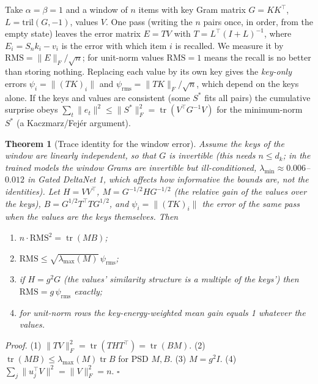 \documentclass{article}
\newtheorem{theorem}{Theorem}
\newcommand{\tr}{\operatorname{tr}}
\begin{document}
Take $\alpha=\beta=1$ and a window of $n$ items with key Gram matrix $G=KK^\top$, $L=\mathrm{tril}(G,-1)$, values $V$. One pass (writing the $n$ pairs once, in order, from the empty state) leaves the error matrix $E=TV$ with $T=L^\top(I+L)^{-1}$, where $E_i=S_nk_i-v_i$ is the error with which item $i$ is recalled. We measure it by $\mathrm{RMS}=\|E\|_F/\sqrt n$; for unit-norm values $\mathrm{RMS}=1$ means the recall is no better than storing nothing. Replacing each value by its own key gives the \emph{key-only} errors $\psi_i=\|(TK)_i\|$ and $\psi_{\mathrm{rms}}=\|TK\|_F/\sqrt n$, which depend on the keys alone. If the keys and values are consistent (some $S^\ast$ fits all pairs) the cumulative surprise obeys $\sum_t\|e_t\|^2\le\|S^\ast\|_F^2=\tr(V^\top G^{-1}V)$ for the minimum-norm $S^\ast$ (a Kaczmarz/Fej\'er argument).

\begin{theorem}[Trace identity for the window error]\label{thm:gain}
Assume the keys of the window are linearly independent, so that $G$ is invertible (this needs $n\le d_k$; in the trained models the window Grams are invertible but ill-conditioned, $\lambda_{\min}\approx0.006$--$0.012$ in Gated DeltaNet 1, which affects how informative the bounds are, not the identities). Let $H=VV^\top$, $M=G^{-1/2}HG^{-1/2}$ (the relative gain of the values over the keys), $B=G^{1/2}T^\top TG^{1/2}$, and $\psi_i=\|(TK)_i\|$ the error of the same pass when the values are the keys themselves. Then
\begin{enumerate}
  \item $n\cdot\mathrm{RMS}^2=\tr(MB)$;
  \item $\mathrm{RMS}\le\sqrt{\lambda_{\max}(M)}\,\psi_{\mathrm{rms}}$;
  \item if $H=g^2G$ (the values' similarity structure is a multiple of the keys') then $\mathrm{RMS}=g\,\psi_{\mathrm{rms}}$ exactly;
  \item for unit-norm rows the key-energy-weighted mean gain equals 1 whatever the values.
\end{enumerate}
\end{theorem}
\emph{Proof.} (1) $\|TV\|_F^2=\tr(THT^\top)=\tr(BM)$. (2) $\tr(MB)\le\lambda_{\max}(M)\tr B$ for PSD $M,B$. (3) $M=g^2I$. (4) $\sum_j\|u_j^\top V\|^2=\|V\|_F^2=n$. $\square$
\end{document}
